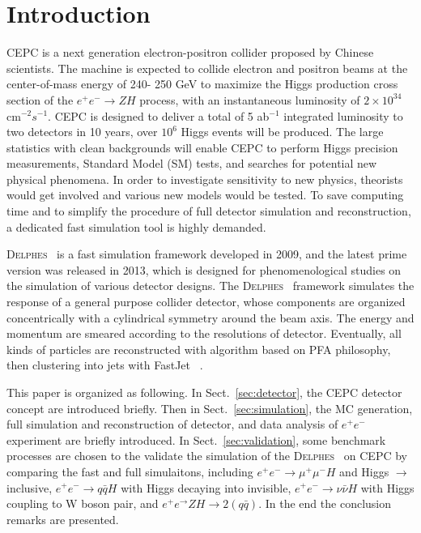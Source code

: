 \documentclass[a4paper,10pt,twoside]{cpc-hepnp}
\begin{document}
%




\section{Introduction}\label{sec:intro}
CEPC\cite{ref:cepc_det, ref:cepc_acc} is a next generation electron-positron collider proposed by Chinese scientists.
The machine is expected to collide electron and positron beams at the center-of-mass energy of 240- 250 GeV to maximize the Higgs production cross section of the $e^+e^- \to ZH$ process, with an instantaneous luminosity of $2\times10^{34}$ cm$^{-2} s^{-1}$.
CEPC is designed to deliver a total of 5 ab$^{-1}$ integrated luminosity to two detectors in 10 years, over $10^6$ Higgs events will be produced.
The large statistics with clean backgrounds will enable CEPC to perform Higgs precision measurements,
Standard Model (SM) tests, and searches for potential new physical phenomena.
In order to investigate  sensitivity to new physics, theorists would get involved and various new models would be tested. To save computing time and to simplify  the procedure of full detector simulation and reconstruction,  a dedicated fast simulation tool is highly demanded.

{\textsc{Delphes}~}\cite{ref:delphes} is a fast simulation framework  developed in 2009, and the latest prime version was released in 2013, which is designed for phenomenological studies on the simulation of various detector designs.
The {\textsc{Delphes}~} framework simulates the response of a general purpose collider detector,
whose components  are organized concentrically with a cylindrical symmetry around the beam axis. The energy and momentum are smeared according to the resolutions of detector. Eventually, all kinds of particles are reconstructed with algorithm based on PFA\cite{ref:pfa} philosophy, then clustering into jets with FastJet~\cite{ref:fastjet} .

This paper is organized as following.  In Sect.{~\ref{sec:detector}}, the CEPC detector concept are introduced briefly.  Then in Sect.{~\ref{sec:simulation}}, the MC generation, full simulation and reconstruction of detector,  and data analysis of $e^+e^-$  experiment are briefly introduced. In Sect.{~\ref{sec:validation}}, some benchmark processes are chosen to the validate the simulation of  the {\textsc{Delphes}~} on CEPC by comparing the fast and full simulaitons, including  $e^+e^- \to \mu^+\mu^- H$  and Higgs $\to $inclusive, $e^+e^- \to q\bar{q} H$ with Higgs decaying into invisible, $e^+e^- \to \nu\bar{\nu} H$ with Higgs coupling to W boson pair, and $e^+e^\to ZH \to 2(q\bar{q})$. In the end the conclusion remarks are presented.
\end{document}
